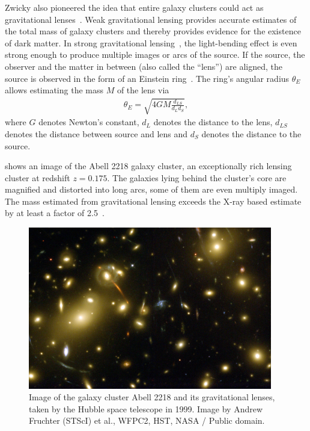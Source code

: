 Zwicky also pioneered the idea that entire galaxy clusters could act as gravitational lenses~\cite{Zwicky1937}. Weak gravitational lensing provides accurate estimates of the total mass of galaxy clusters and thereby provides evidence for the existence of dark matter.
In strong gravitational lensing~\cite{Bartelmann2010}, the light-bending effect is even strong enough to produce multiple images or arcs of the source. If the source, the observer and the matter in between (also called the ``lens'') are aligned, the source is observed in the form of an Einstein ring~\cite{Einstein1936}. The ring's angular radius \(\theta_{E}\) allows estimating the mass \(M\) of the lens via
\begin{align}
    \theta_{E} = \sqrt{4 G M \frac{d_{LS}}{d_{L} d_{S}}},
\end{align}
where \(G\) denotes Newton's constant, \(d_{L}\) denotes the distance to the lens, \(d_{LS}\) denotes the distance between source and lens and \(d_{S}\) denotes the distance to the source.

 shows an image of the Abell 2218 galaxy cluster, an exceptionally rich lensing cluster at redshift \(z=0.175\). The galaxies lying behind the cluster's core are magnified and distorted into long arcs, some of them are even multiply imaged. The mass estimated from gravitational lensing exceeds the X-ray based estimate by at least a factor of 2.5~\cite{AbdelSalam1998}.
\begin{figure}[htbp]
    \centering
    \includegraphics[width=0.95\textwidth]{figures/darkmatter/abell_NGC2218.jpg}
    \caption{Image of the galaxy cluster Abell 2218 and its gravitational lenses, taken by the Hubble space telescope in 1999. Image by Andrew Fruchter (STScI) et al., WFPC2, HST, NASA / Public domain.}
    \label{fig:dm:evidence:cluster:abell2218}
\end{figure}


